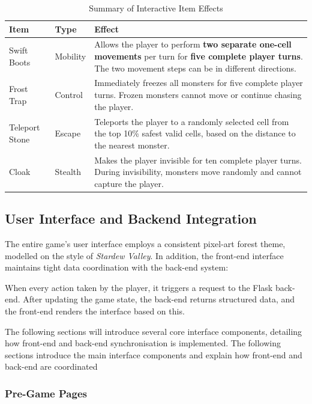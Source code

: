 \documentclass[12pt,a4paper]{article}
\begin{document}
\begin{table}[H]
\centering
\caption{Summary of Interactive Item Effects}
\label{tab:item_effects}
\renewcommand{\arraystretch}{1.25}
\begin{tabular}{p{3cm} p{3cm} p{8cm}}
\toprule
\textbf{Item} & \textbf{Type} & \textbf{Effect} \\
\midrule
Swift Boots & Mobility & Allows the player to perform \textbf{two separate one-cell movements} per turn for \textbf{five complete player turns}. The two movement steps can be in different directions. \\
Frost Trap & Control & Immediately freezes all monsters for five complete player turns. Frozen monsters cannot move or continue chasing the player. \\
Teleport Stone & Escape & Teleports the player to a randomly selected cell from the top 10\% safest valid cells, based on the distance to the nearest monster. \\
Cloak & Stealth & Makes the player invisible for ten complete player turns. During invisibility, monsters move randomly and cannot capture the player. \\
\bottomrule
\end{tabular}
\end{table}


\subsection{User Interface and Backend Integration}

The entire game's user interface employs a consistent pixel-art forest theme, modelled on the style of \textit{Stardew Valley}. In addition, the front-end interface maintains tight data coordination with the back-end system:

When every action taken by the player, it triggers a request to the Flask back-end. After updating the game state, the back-end returns structured data, and the front-end renders the interface based on this.

The following sections will introduce several core interface components, detailing how front-end and back-end synchronisation is implemented. The following sections introduce the main interface components and explain how front-end and back-end are coordinated

\subsubsection{Pre-Game Pages}
\end{document}
